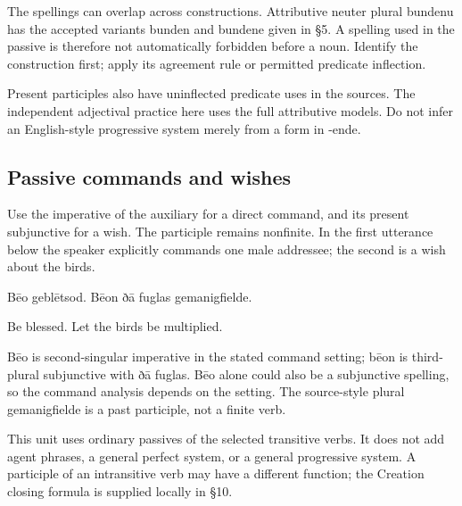 The spellings can overlap across constructions. Attributive neuter plural bundenu has the accepted variants bunden and bundene given in §5. A spelling used in the passive is therefore not automatically forbidden before a noun. Identify the construction first; apply its agreement rule or permitted predicate inflection.

Present participles also have uninflected predicate uses in the sources. The independent adjectival practice here uses the full attributive models. Do not infer an English-style progressive system merely from a form in -ende.

\subsection*{Passive commands and wishes}

Use the imperative of the auxiliary for a direct command, and its present subjunctive for a wish. The participle remains nonfinite. In the first utterance below the speaker explicitly commands one male addressee; the second is a wish about the birds.

Bēo geblētsod. Bēon ðā fuglas gemanigfielde.

Be blessed. Let the birds be multiplied.

Bēo is second-singular imperative in the stated command setting; bēon is third-plural subjunctive with ðā fuglas. Bēo alone could also be a subjunctive spelling, so the command analysis depends on the setting. The source-style plural gemanigfielde is a past participle, not a finite verb.

This unit uses ordinary passives of the selected transitive verbs. It does not add agent phrases, a general perfect system, or a general progressive system. A participle of an intransitive verb may have a different function; the Creation closing formula is supplied locally in §10.

